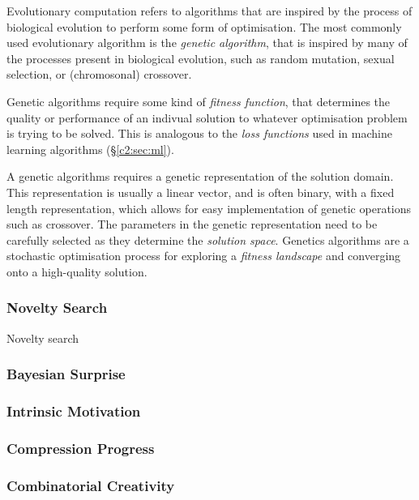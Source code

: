 Evolutionary computation refers to algorithms that are inspired by the process of biological evolution to perform some form of optimisation. 
The most commonly used evolutionary algorithm is the \textit{genetic algorithm}, that is inspired by many of the processes present in biological evolution, such as random mutation, sexual selection, or (chromosonal) crossover.

Genetic algorithms require some kind of \textit{fitness function}, that determines the quality or performance of an indivual solution to whatever optimisation problem is trying to be solved. This is analogous to the \textit{loss functions} used in machine learning algorithms (\S \ref{c2:sec:ml}). 

A genetic algorithms requires a genetic representation of the solution domain. 
This representation is usually a linear vector, and is often binary, with a fixed length representation, which allows for easy implementation of genetic operations such as crossover. 
The parameters in the genetic representation need to be carefully selected as they determine the \textit{solution space}.
Genetics algorithms are a stochastic optimisation process for exploring a \textit{fitness landscape} and converging onto a high-quality solution. 


\subsubsection{Novelty Search}

Novelty search 

\subsubsection{Bayesian Surprise}

\subsubsection{Intrinsic Motivation}

\subsubsection{Compression Progress}

\subsubsection{Combinatorial Creativity}

